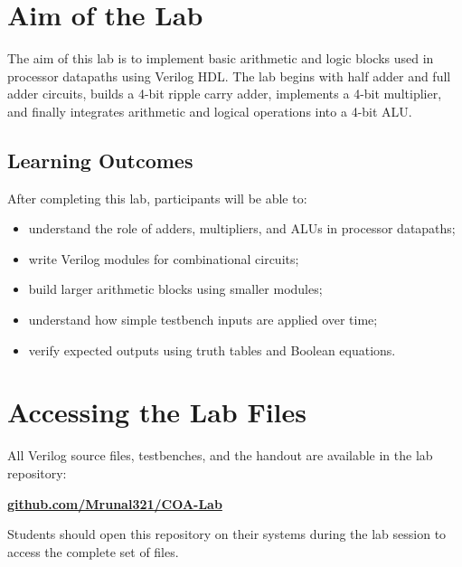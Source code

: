 \documentclass[11pt,a4paper]{article}
\begin{document}
\section{Aim of the Lab}

\begin{objectivebox}
The aim of this lab is to implement basic arithmetic and logic blocks used in processor datapaths using Verilog HDL. The lab begins with half adder and full adder circuits, builds a 4-bit ripple carry adder, implements a 4-bit multiplier, and finally integrates arithmetic and logical operations into a 4-bit ALU.
\end{objectivebox}

\subsection*{Learning Outcomes}

After completing this lab, participants will be able to:

\begin{itemize}[leftmargin=*]
    \item understand the role of adders, multipliers, and ALUs in processor datapaths;
    \item write Verilog modules for combinational circuits;
    \item build larger arithmetic blocks using smaller modules;
    \item understand how simple testbench inputs are applied over time;
    \item verify expected outputs using truth tables and Boolean equations.
\end{itemize}

\section{Accessing the Lab Files}

\begin{notebox}
All Verilog source files, testbenches, and the handout are available in the lab repository:

\medskip
\centerline{\Large\textbf{\href{https://github.com/Mrunal321/COA-Lab}{github.com/Mrunal321/COA-Lab}}}

\medskip
Students should open this repository on their systems during the lab session to access the complete set of files.
\end{notebox}
\end{document}

